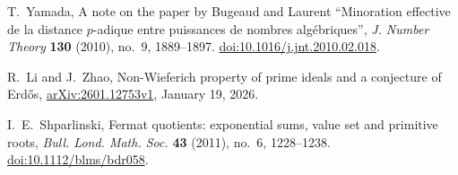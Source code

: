 
T.~Yamada,
A note on the paper by Bugeaud and Laurent ``Minoration effective de la
distance $p$-adique entre puissances de nombres alg\'ebriques'',
\emph{J. Number Theory} \textbf{130} (2010), no.~9, 1889--1897.
\href{https://doi.org/10.1016/j.jnt.2010.02.018}%
{doi:10.1016/j.jnt.2010.02.018}.

R.~Li and J.~Zhao,
Non-Wieferich property of prime ideals and a conjecture of Erd\H{o}s,
\href{https://arxiv.org/abs/2601.12753v1}{arXiv:2601.12753v1},
January 19, 2026.

I.~E.~Shparlinski,
Fermat quotients: exponential sums, value set and primitive roots,
\emph{Bull. Lond. Math. Soc.} \textbf{43} (2011), no.~6, 1228--1238.
\href{https://doi.org/10.1112/blms/bdr058}{doi:10.1112/blms/bdr058}.
